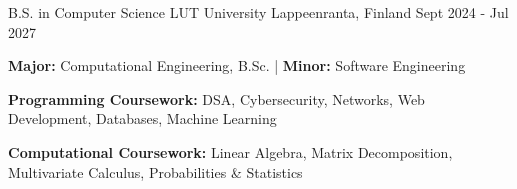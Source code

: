 

\begin{cventries}

  \vspace{-0.3mm}
  \cventryalt
    {B.S. in Computer Science} %
    {LUT University} %
    {Lappeenranta, Finland} %
    {Sept 2024 - Jul 2027} %
    {
      \begin{cvitems} %
        \item {\textbf{Major:} Computational Engineering, B.Sc. | \textbf{Minor:} Software Engineering}
        \item {\textbf{Programming Coursework:} DSA, Cybersecurity, Networks, Web Development, Databases, Machine Learning}
        \item {\textbf{Computational Coursework:} Linear Algebra, Matrix Decomposition, Multivariate Calculus, Probabilities \& Statistics}
      \end{cvitems}
    }
\end{cventries}
\vspace{-3.0mm}